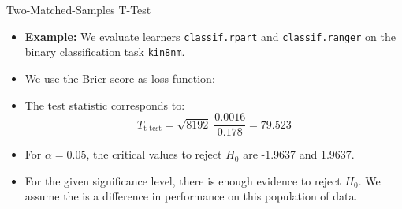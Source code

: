 \documentclass[11pt,compress,t,notes=noshow, xcolor=table]{beamer}
\begin{document}

\begin{frame}{Two-Matched-Samples T-Test}
\begin{itemize}
    \item \textbf{Example:} We evaluate learners \texttt{classif.rpart} and \texttt{classif.ranger} on the binary classification task \texttt{kin8nm}.
    \item We use the Brier score as loss function:
    {
        \scriptsize
        
    }
    \item The test statistic corresponds to:
    $$
    T_{\text{t-test}} = \sqrt{8192} \; \frac{0.0016}{0.178} = 79.523
    $$
    \item For $\alpha = 0.05$, the critical values to reject $H_0$ are -1.9637 and 1.9637.
    \item For the given significance level, there is enough evidence to reject $H_0$. We assume the is a difference in performance on this population of data.
\end{itemize}

\end{frame}
\end{document}
